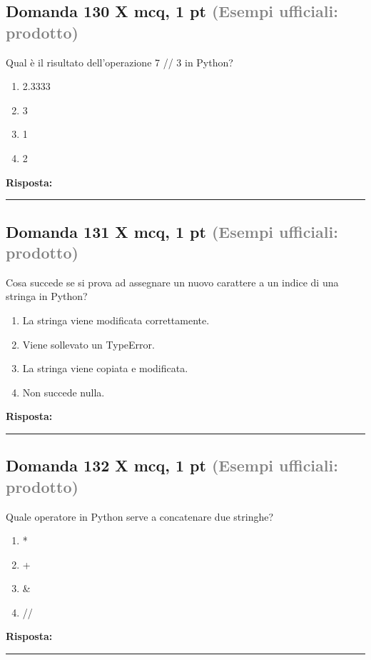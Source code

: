 \documentclass[a4paper,11pt]{article}
\begin{document}
\subsection*{Domanda 130 X \hfill {\small mcq, 1 pt \textcolor{gray}{(Esempi ufficiali: prodotto)}}}
Qual è il risultato dell'operazione 7 // 3 in Python?

\begin{enumerate}[label=\alph*)]
\item 2.3333
\item 3
\item 1
\item 2
\end{enumerate}
\vspace{0.2cm}
\noindent\textbf{Risposta:}\par
\vspace{1.5cm}\hrule


\subsection*{Domanda 131 X \hfill {\small mcq, 1 pt \textcolor{gray}{(Esempi ufficiali: prodotto)}}}
Cosa succede se si prova ad assegnare un nuovo carattere a un indice di una stringa in Python?

\begin{enumerate}[label=\alph*)]
\item La stringa viene modificata correttamente.
\item Viene sollevato un TypeError.
\item La stringa viene copiata e modificata.
\item Non succede nulla.
\end{enumerate}
\vspace{0.2cm}
\noindent\textbf{Risposta:}\par
\vspace{1.5cm}\hrule


\subsection*{Domanda 132 X \hfill {\small mcq, 1 pt \textcolor{gray}{(Esempi ufficiali: prodotto)}}}
Quale operatore in Python serve a concatenare due stringhe?

\begin{enumerate}[label=\alph*)]
\item *
\item +
\item \&
\item //
\end{enumerate}
\vspace{0.2cm}
\noindent\textbf{Risposta:}\par
\vspace{1.5cm}\hrule
\end{document}
